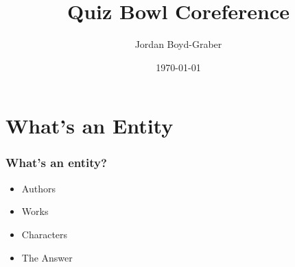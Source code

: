 \documentclass[compress]{beamer}
\title{Quiz Bowl Coreference}
\author{Jordan Boyd-Graber}
\date{\today}
\begin{document}


\section{What's an Entity}

\begin{frame}
  \frametitle{What's an entity?}

  \begin{itemize}
    \item Authors
    \item Works
    \item Characters
    \item The Answer
  \end{itemize}

\end{frame}
\end{document}
